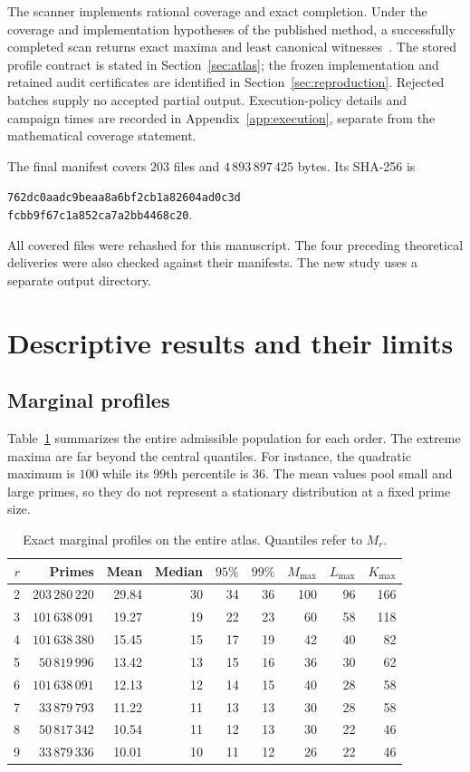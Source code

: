 \documentclass[11pt]{article}
\theoremstyle{definition}\newtheorem{definition}[theorem]{Definition}
\begin{document}
The scanner implements rational coverage and exact completion. Under the
coverage and implementation hypotheses of the published method, a
successfully completed scan returns exact maxima and least canonical
witnesses~\cite[Theorems~3.1 and~4.3]{gpumethod}.
The stored profile contract is stated in Section~\ref{sec:atlas};
the frozen implementation and retained audit certificates are identified
in Section~\ref{sec:reproduction}. Rejected batches supply no accepted
partial output. Execution-policy details and campaign times are
recorded in Appendix~\ref{app:execution}, separate from the mathematical
coverage statement.

The final manifest covers $203$ files and $4\,893\,897\,425$ bytes.
Its SHA-256 is
\begin{center}\small
\texttt{762dc0aadc9beaa8a6bf2cb1a82604ad0c3d}\\
\texttt{fcbb9f67c1a852ca7a2bb4468c20}.
\end{center}
All covered files were rehashed for this manuscript. The four preceding
theoretical deliveries were also checked against their manifests.
The new study uses a separate output directory.

\section{Descriptive results and their limits}\label{sec:descriptive}
\subsection{Marginal profiles}
Table~\ref{tab:profiles} summarizes the entire admissible population for
each order. The extreme maxima are far beyond the central quantiles.
For instance, the quadratic maximum is $100$ while its $99$th
percentile is $36$. The mean values pool small and large primes, so
they do not represent a stationary distribution at a fixed prime size.
\begin{table}[htbp]\centering\small\setlength{\tabcolsep}{4pt}
\caption{Exact marginal profiles on the entire atlas. Quantiles refer to $M_r$.}\label{tab:profiles}
\begin{tabular}{rrrrrrrrr}
\toprule
$r$ & Primes & Mean & Median & $95\%$ & $99\%$ & $M_{\max}$ & $L_{\max}$ & $K_{\max}$ \\
\midrule
2 & $203\,280\,220$ & 29.84 & 30 & 34 & 36 & 100 & 96 & 166 \\
3 & $101\,638\,091$ & 19.27 & 19 & 22 & 23 & 60 & 58 & 118 \\
4 & $101\,638\,380$ & 15.45 & 15 & 17 & 19 & 42 & 40 & 82 \\
5 & $50\,819\,996$ & 13.42 & 13 & 15 & 16 & 36 & 30 & 62 \\
6 & $101\,638\,091$ & 12.13 & 12 & 14 & 15 & 40 & 28 & 58 \\
7 & $33\,879\,793$ & 11.22 & 11 & 13 & 13 & 30 & 28 & 58 \\
8 & $50\,817\,342$ & 10.54 & 11 & 12 & 13 & 30 & 22 & 46 \\
9 & $33\,879\,336$ & 10.01 & 10 & 11 & 12 & 26 & 22 & 46 \\
\bottomrule\end{tabular}\end{table}
\end{document}
